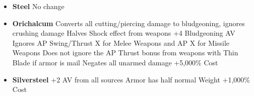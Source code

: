 \documentclass[oneside,11pt,english]{book}
\begin{document}
\begin{itemize}
\item [] \textbf{Steel}
\subitem No change
\end{itemize}

\begin{itemize}
	\item [] \textbf{Orichalcum}
		\subitem Converts all cutting/piercing damage to bludgeoning, ignores crushing damage
		\subitem Halves Shock effect from weapons
		\subitem +4 Bludgeoning AV
		\subitem Ignores AP Swing/Thrust X for Melee Weapons and AP X for Missile Weapons
			\subsubitem Does not ignore the AP Thrust bonus from weapons with Thin Blade if armor is mail
		\subitem Negates all unarmed damage
		\subitem +5,000\% Cost
\end{itemize}

\begin{itemize}
	\item [] \textbf{Silversteel}
		\subitem +2 AV from all sources
		\subitem Armor has half normal Weight 
		\subitem +1,000\% Cost
\end{itemize}
\end{document}
